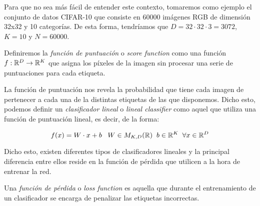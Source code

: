 Para que no sea más fácil de entender este contexto, tomaremos como ejemplo el conjunto de datos CIFAR-10 que consiste en 60000 imágenes RGB de dimensión 32x32 y 10 categorías. De esta forma, tendríamos que $D=32\cdot 32 \cdot 3 = 3072$, $K=10$ y $N=60000$.

\begin{definicion}\label{def:ScoreFunction}
Definiremos la \emph{función de puntuación} o \emph{score function} como una función $f:\mathbb{R}^D \to \mathbb{R}^K$ que asigna los píxeles de la imagen sin procesar una serie de puntuaciones para cada etiqueta.
\end{definicion}

La función de puntuación nos revela la probabilidad que tiene cada imagen de pertenecer a cada una de la distintas etiquetas de las que disponemos. Dicho esto, podemos definir un \emph{clasificador lineal} o \emph{lineal classifier} \label{def:LinealClassifier} como aquel que utiliza una función de puntuación lineal, es decir, de la forma:

$$f(x)=W\cdot x+ b\; \; \; W\in M_{K,D}(\mathbb{R}) \;\; b \in \mathbb{R}^K \;\; \forall x\in \mathbb{R}^D$$

Dicho esto, existen diferentes tipos de clasificadores lineales y la principal diferencia entre ellos reside en la función de pérdida que utilicen a la hora de entrenar la red.

\begin{definicion}\label{LossFunction}
Una \emph{función de pérdida} o \emph{loss function} es aquella que durante el entrenamiento de un clasificador se encarga de penalizar las etiquetas incorrectas.
\end{definicion}
